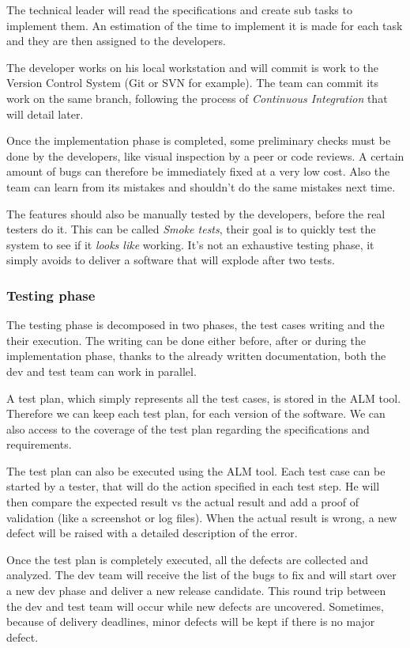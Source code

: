 The technical leader will read the specifications and create sub tasks to
implement them.
An estimation of the time to implement it is made for each task and they are
then assigned to the developers.

The developer works on his local workstation and will commit is work to the
Version Control System (Git or SVN for example).
The team can commit its work on the same branch, following the process of
\textit{Continuous Integration} that will detail later.

Once the implementation phase is completed, some preliminary checks must be
done by the developers, like visual inspection by a peer or code reviews.
A certain amount of bugs can therefore be immediately fixed at a very low cost.
Also the team can learn from its mistakes and shouldn't do the same mistakes
next time.

The features should also be manually tested by the developers, before the real
testers do it.
This can be called \textit{Smoke tests}, their goal is to quickly test the
system to see if it \textit{looks like} working.
It's not an exhaustive testing phase, it simply avoids to deliver a software
that will explode after two tests.

\subsubsection{Testing phase}
The testing phase is decomposed in two phases, the test cases writing and the
their execution.
The writing can be done either before, after or during the implementation
phase, thanks to the already written documentation, both the dev and test
team can work in parallel.

A test plan, which simply represents all the test cases, is stored in the ALM
tool.
Therefore we can keep each test plan, for each version of the software.
We can also access to the coverage of the test plan regarding the
specifications and requirements.

The test plan can also be executed using the ALM tool.
Each test case can be started by a tester, that will do the action specified in
each test step.
He will then compare the expected result vs the actual result and add a proof
of validation (like a screenshot or log files).
When the actual result is wrong, a new defect will be raised with a detailed
description of the error.

Once the test plan is completely executed, all the defects are collected and
analyzed.
The dev team will receive the list of the bugs to fix and will start over a
new dev phase and deliver a new release candidate.
This round trip between the dev and test team will occur while new defects
are uncovered.
Sometimes, because of delivery deadlines, minor defects will be kept if there
is no major defect.

